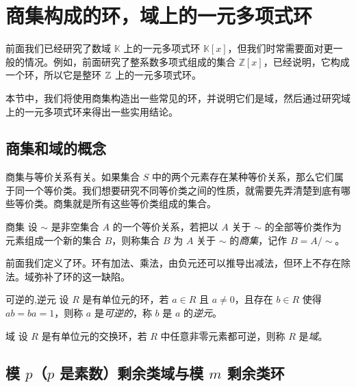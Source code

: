 
\section{商集构成的环，域上的一元多项式环}

前面我们已经研究了数域 $\mathbb K$ 上的一元多项式环 $\mathbb K[x]$，但我们时常需要面对更一般的情况。例如，前面研究了整系数多项式组成的集合 $\mathbb Z[x]$，已经说明，它构成一个环，所以它是整环 $\mathbb Z$ 上的一元多项式环。

本节中，我们将使用商集构造出一些常见的环，并说明它们是域，然后通过研究域上的一元多项式环来得出一些实用结论。

\subsection{商集和域的概念}

商集与等价关系有关。如果集合 $S$ 中的两个元素存在某种等价关系，那么它们属于同一个等价类。我们想要研究不同等价类之间的性质，就需要先弄清楚到底有哪些等价类。商集就是所有这些等价类组成的集合。

\begin{definition}{商集}
	设 $\sim$ 是非空集合 $A$ 的一个等价关系，若把以 $A$ 关于 $\sim$ 的全部等价类作为元素组成一个新的集合 $B$，则称集合 $B$ 为 $A$ 关于 $\sim$ 的\emph{商集}，记作 $B = A / {\sim}$。
\end{definition}

\bigskip

前面我们定义了环。环有加法、乘法，由负元还可以推导出减法，但环上不存在除法。域弥补了环的这一缺陷。

\begin{definition}{可逆的,逆元}
	设 $R$ 是有单位元的环，若 $a \in R$ 且 $a \ne 0$，且存在 $b \in R$ 使得 $ab = ba = 1$，则称 $a$ 是\emph{可逆的}，称 $b$ 是 $a$ 的\emph{逆元}。
\end{definition}

\begin{definition}{域}
	设 $R$ 是有单位元的交换环，若 $R$ 中任意非零元素都可逆，则称 $R$ 是\emph{域}。
\end{definition}

\subsection{模 $p$（$p$ 是素数）剩余类域与模 $m$ 剩余类环}

